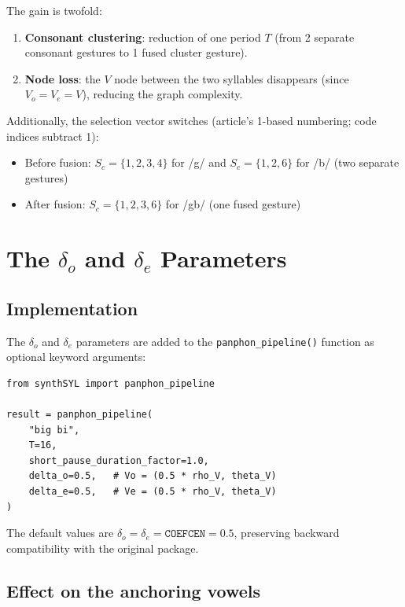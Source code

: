 \documentclass[11pt,a4paper]{article}
\begin{document}
The gain is twofold:
\begin{enumerate}
\item \textbf{Consonant clustering}: reduction of one period $T$
  (from 2 separate consonant gestures to 1 fused cluster gesture).
\item \textbf{Node loss}: the $V$ node between the two syllables
  disappears (since $V_o = V_e = V$), reducing the graph complexity.
\end{enumerate}

Additionally, the selection vector switches (article's 1-based
numbering; code indices subtract 1):
\begin{itemize}
\item Before fusion: $S_c = \{1,2,3,4\}$ for /g/ and $S_c = \{1,2,6\}$
  for /b/ (two separate gestures)
\item After fusion: $S_c = \{1,2,3,6\}$ for /gb/ (one fused gesture)
\end{itemize}

\section{The $\delta_o$ and $\delta_e$ Parameters}

\subsection{Implementation}

The $\delta_o$ and $\delta_e$ parameters are added to the
\texttt{panphon\_pipeline()} function as optional keyword arguments:

\begin{lstlisting}
from synthSYL import panphon_pipeline

result = panphon_pipeline(
    "big bi",
    T=16,
    short_pause_duration_factor=1.0,
    delta_o=0.5,   # Vo = (0.5 * rho_V, theta_V)
    delta_e=0.5,   # Ve = (0.5 * rho_V, theta_V)
)
\end{lstlisting}

The default values are $\delta_o = \delta_e = \texttt{COEFCEN} = 0.5$,
preserving backward compatibility with the original package.

\subsection{Effect on the anchoring vowels}
\end{document}
